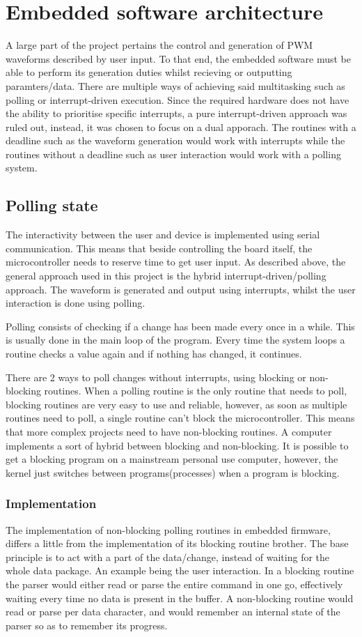 \section{Embedded software architecture}
A large part of the project pertains the control and generation of PWM waveforms described by
user input. To that end, the embedded software must be able to perform its generation duties whilst
recieving or outputting paramters/data. There are multiple ways of achieving said multitasking such as
polling or interrupt-driven execution. Since the required hardware does not have the ability to prioritise
specific interrupts, a pure interrupt-driven approach was ruled out, instead, it was chosen to focus on a dual apporach. The routines with a deadline such as the waveform generation would work with interrupts while the routines without a deadline such as user interaction would work with a polling system.

\subsection{Polling state}
The interactivity between the user and device is implemented using serial communication.
This means that beside controlling the board itself, the microcontroller needs to reserve
time to get user input. As described above, the general approach used in this project is
the hybrid interrupt-driven/polling approach. The waveform is generated and output using
interrupts, whilst the user interaction is done using polling.

Polling consists of checking if a change has been made every once in a while. This
is usually done in the main loop of the program. Every time the system loops a routine
checks a value again and if nothing has changed, it continues. 

There are 2 ways to poll changes without interrupts, using blocking or non-blocking routines.
When a polling routine is the only routine that needs to poll, blocking routines are
very easy to use and reliable, however, as soon as multiple routines need to poll, a single
routine can't block the microcontroller. This means that more complex projects need to have
non-blocking routines. A computer implements a sort of hybrid between blocking and non-blocking.
It is possible to get a blocking program on a mainstream personal use computer, however, the kernel
just switches between programs(processes) when a program is blocking.

\subsubsection{Implementation}
The implementation of non-blocking polling routines in embedded firmware, differs a little
from the implementation of its blocking routine brother. The base principle is to act with
a part of the data/change, instead of waiting for the whole data package. An example being
the user interaction. In a blocking routine the parser would either read or parse the entire
command in one go, effectively waiting every time no data is present in the buffer.
A non-blocking routine would read or parse per data character, and would remember an internal
state of the parser so as to remember its progress.

